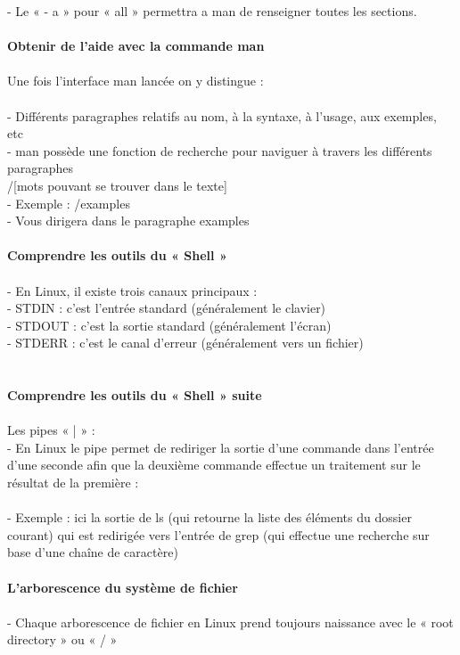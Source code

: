 \documentclass[10pt,a4paper]{article}
\begin{document}
- Le « - a » pour « all » permettra a man de renseigner toutes les sections.\\\\
{\large\textbf{Obtenir de l’aide avec la commande man}}\\\\
Une fois l’interface man lancée on y distingue :  \\\\
- Différents paragraphes relatifs au nom, à la syntaxe, à l’usage, aux exemples, etc\\
- man possède une fonction de recherche pour naviguer à travers les différents paragraphes\\  /[mots pouvant se trouver dans le texte] \\
- Exemple : /examples \\
- Vous dirigera dans le paragraphe examples \\\\
{\large\textbf{Comprendre les outils du « Shell »}}\\\\
- En Linux, il existe trois canaux principaux :\\
- STDIN : c’est l’entrée standard (généralement le clavier) \\
- STDOUT : c’est la sortie standard (généralement l’écran)\\ 
- STDERR : c’est le canal d’erreur (généralement vers un fichier)\\\\\\
 {\large\textbf{Comprendre les outils du « Shell » suite }}\\\\
Les pipes « | » : \\
- En Linux le pipe permet de rediriger la sortie d’une commande dans l’entrée d’une seconde afin que la deuxième commande effectue un traitement sur le résultat de la première  : \\\\
- Exemple : ici la sortie de ls (qui retourne la liste des éléments du dossier courant) qui est redirigée vers l’entrée de grep (qui effectue une recherche sur base d’une chaîne de caractère) \\\\
{\large\textbf{L’arborescence du système de fichier}}\\\\
- Chaque arborescence de fichier en Linux prend toujours naissance avec le « root directory » ou « / » \\
\end{document}
